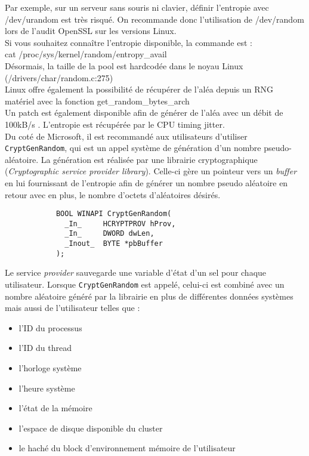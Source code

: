			Par exemple, sur un serveur sans souris ni clavier, 
			définir l'entropie avec	/dev/urandom est très risqué. 
			On recommande donc l'utilisation de /dev/random lors de 
			l'audit OpenSSL sur les versions Linux.\\
	
			Si vous souhaitez connaître l'entropie disponible, la commande est : 
			\\ cat /proc/sys/kernel/random/entropy\_avail\\
	
			Désormais, la taille de la pool est hardcodée dans le noyau Linux 
			(/drivers/char/random.c:275)\\
			
			Linux offre également la possibilité de récupérer de l’aléa depuis 
			un RNG matériel avec la fonction get\_random\_bytes\_arch
			\cite{archlinuxRNG}\\
		
			Un patch est également disponible afin de générer de l'aléa avec un 
			débit de 100kB/s \cite{mueller2013rng}. 
			L'entropie est récupérée par le CPU timing jitter.\\
			
			Du coté de Microsoft, il est recommandé aux utilisateurs d'utiliser 
			\texttt{CryptGenRandom}, \cite{wikicryptgenrandom}
			qui est un appel système de génération d'un nombre pseudo-aléatoire. 
			La génération est réalisée par une librairie cryptographique
			 (\textit{Cryptographic service provider library}).
			Celle-ci gère un pointeur vers un \textit{buffer} en lui 
			fournissant de l'entropie afin de générer un nombre pseudo 
			aléatoire en retour avec en plus, le nombre	d'octets d'aléatoires
			désirés.
			
			\begin{verbatim}
			BOOL WINAPI CryptGenRandom(
			  _In_     HCRYPTPROV hProv,
			  _In_     DWORD dwLen,
			  _Inout_  BYTE *pbBuffer
			);
			\end{verbatim}
			
			
			Le service \textit{provider} sauvegarde une variable d'état d'un 
			sel pour chaque utilisateur. Lorsque \texttt{CryptGenRandom} est 
			appelé, celui-ci est combiné avec un nombre aléatoire généré par 
			la librairie en plus de différentes données systèmes mais aussi de 
			l'utilisateur telles que :\\
			\begin{itemize}
			\item l’ID du processus
			\item l'ID du thread
			\item l'horloge système
			\item l'heure système
			\item l'état de la mémoire
			\item l’espace de disque disponible du cluster
			\item le haché du block d'environnement mémoire de l’utilisateur\\
			\end{itemize} 
			
